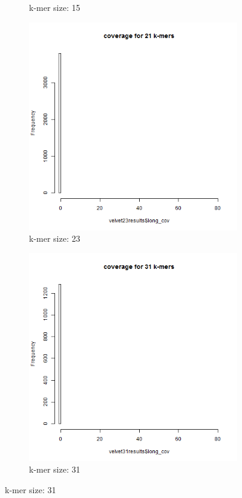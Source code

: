 \documentclass[%
   10pt,              %
   ngerman,           %
   a4paper,           %
   DIV11,             %
]{scrartcl}%
\begin{document}
\begin{figure}[h]
\begin{subfigure}[t] {0.2\textwidth}
		\caption{k-mer size: 15}
		\label{Velvet-15-mers-coverage}
	\end{subfigure}
	\begin{subfigure}[t] {0.2\textwidth}
		\includegraphics[width=\textwidth]{exercise2/velvet23kmersCoverage.png}
		\caption{k-mer size: 23}
		\label{Velvet-23-mers-coverage}
	\end{subfigure}
	\begin{subfigure}[t] {0.2\textwidth}
		\includegraphics[width=\textwidth]{exercise2/velvet31kmersCoverage.png}
		\caption{k-mer size: 31}
		\label{Velvet-31-mers-coverage}
	\end{subfigure}


\end{figure}
\end{document}
